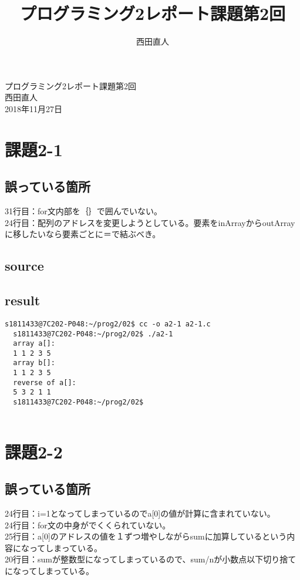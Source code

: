 \documentclass[10pt,a4paper]{jsarticle}
\title{プログラミング2レポート課題第2回}
\author{西田直人}
\begin{document}
\begin{center}
{\LARGE プログラミング2レポート課題第2回} \\
\large
西田直人 \\ 2018年11月27日
\end{center}
\normalsize
\section{課題2-1}
\subsection{誤っている箇所}
\noindent31行目：for文内部を｛｝で囲んでいない。\\
24行目：配列のアドレスを変更しようとしている。要素をinArrayからoutArrayに移したいなら要素ごとに＝で結ぶべき。

\subsection{source}


\subsection{result}
\begin{lstlisting}[basicstyle=\ttfamily\footnotesize,frame=single]
  s1811433@7C202-P048:~/prog2/02$ cc -o a2-1 a2-1.c
  s1811433@7C202-P048:~/prog2/02$ ./a2-1
  array a[]:
  1 1 2 3 5
  array b[]:
  1 1 2 3 5
  reverse of a[]:
  5 3 2 1 1 
  s1811433@7C202-P048:~/prog2/02$
  
\end{lstlisting}


\section{課題2-2}
\subsection{誤っている箇所}
\noindent24行目：i=1となってしまっているのでa[0]の値が計算に含まれていない。\\
24行目：for文の中身が{}でくくられていない。\\
25行目：a[0]のアドレスの値を１ずつ増やしながらsumに加算しているという内容になってしまっている。\\
20行目：sumが整数型になってしまっているので、sum/nが小数点以下切り捨てになってしまっている。
\end{document}
